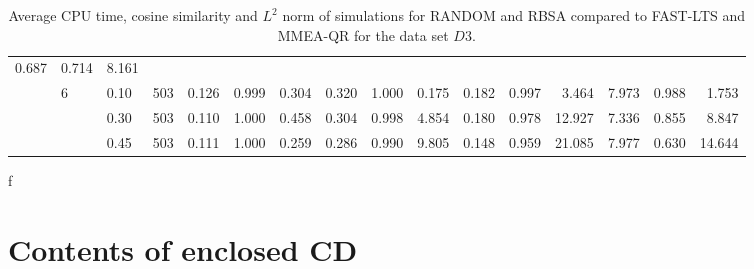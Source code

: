 \documentclass[thesis=B,english]{FITthesis}[2012/10/20]
\begin{document}
\begin{table}[h!]
\begin{adjustbox}{angle=90}
{\begin{tabular}{ll|l|l|r|r|r|r|r|r|r|r|r|r|r|r|}
0.687 &  0.714 &   8.161 \\     & 6 & 0.10 & 503 &    0.126 &  0.999 &  0.304 &   0.320 &  1.000 &  0.175 &  0.182 &  0.997 &   3.464 &  7.973 &  0.988 &   1.753 \\     &   & 0.30 & 503 &    0.110 &  1.000 &  0.458 &   0.304 &  0.998 &  4.854 &  0.180 &  0.978 &  12.927 &  7.336 &  0.855 &   8.847 \\     &   & 0.45 & 503 &    0.111 &  1.000 &  0.259 &   0.286 &  0.990 &  9.805 &  0.148 &  0.959 &  21.085 &  7.977 &  0.630 &  14.644 \\
                         
                 \hline
                \end{tabular}
			}
			
\end{adjustbox}
    
    \caption{Average CPU time, cosine similarity and $L^2$ norm of simulations for RANDOM and RBSA  compared to FAST-LTS and MMEA-QR for the data set $D3$.}
    \label{table:randim:3}
\end{table}
f





\chapter{Contents of enclosed CD}
\begin{figure}
\end{figure}
\end{document}
